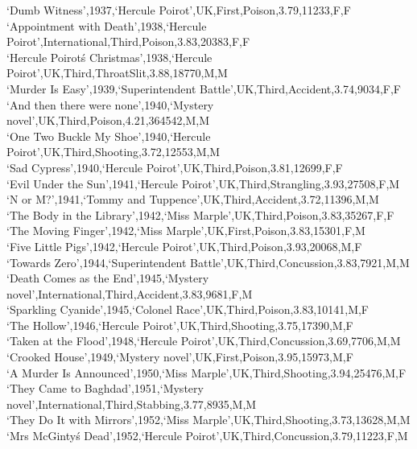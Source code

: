 \documentclass{mproj}
\begin{document}
`Dumb Witness',1937,`Hercule Poirot',UK,First,Poison,3.79,11233,F,F\\
`Appointment with Death',1938,`Hercule Poirot',International,Third,Poison,3.83,20383,F,F\\
`Hercule Poirot\'s Christmas',1938,`Hercule Poirot',UK,Third,ThroatSlit,3.88,18770,M,M\\
`Murder Is Easy',1939,`Superintendent Battle',UK,Third,Accident,3.74,9034,F,F\\
`And then there were none',1940,`Mystery novel',UK,Third,Poison,4.21,364542,M,M\\
`One Two Buckle My Shoe',1940,`Hercule Poirot',UK,Third,Shooting,3.72,12553,M,M\\
`Sad Cypress',1940,`Hercule Poirot',UK,Third,Poison,3.81,12699,F,F\\
`Evil Under the Sun',1941,`Hercule Poirot',UK,Third,Strangling,3.93,27508,F,M\\
`N or M?',1941,`Tommy and Tuppence',UK,Third,Accident,3.72,11396,M,M\\
`The Body in the Library',1942,`Miss Marple',UK,Third,Poison,3.83,35267,F,F\\
`The Moving Finger',1942,`Miss Marple',UK,First,Poison,3.83,15301,F,M\\
`Five Little Pigs',1942,`Hercule Poirot',UK,Third,Poison,3.93,20068,M,F\\
`Towards Zero',1944,`Superintendent Battle',UK,Third,Concussion,3.83,7921,M,M\\
`Death Comes as the End',1945,`Mystery novel',International,Third,Accident,3.83,9681,F,M\\
`Sparkling Cyanide',1945,`Colonel Race',UK,Third,Poison,3.83,10141,M,F\\
`The Hollow',1946,`Hercule Poirot',UK,Third,Shooting,3.75,17390,M,F\\
`Taken at the Flood',1948,`Hercule Poirot',UK,Third,Concussion,3.69,7706,M,M\\
`Crooked House',1949,`Mystery novel',UK,First,Poison,3.95,15973,M,F\\
`A Murder Is Announced',1950,`Miss Marple',UK,Third,Shooting,3.94,25476,M,F\\
`They Came to Baghdad',1951,`Mystery novel',International,Third,Stabbing,3.77,8935,M,M\\
`They Do It with Mirrors',1952,`Miss Marple',UK,Third,Shooting,3.73,13628,M,M\\
`Mrs McGinty\'s Dead',1952,`Hercule Poirot',UK,Third,Concussion,3.79,11223,F,M\\
\end{document}
